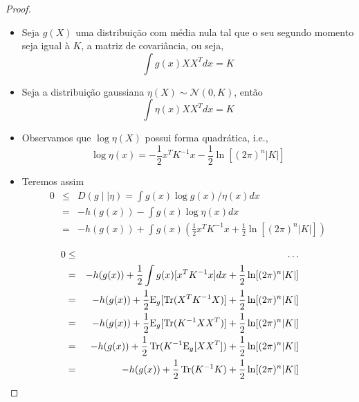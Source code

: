 \begin{frame}[allowframebreaks]
  \begin{proof}
  \begin{itemize}
  \item Seja $g(X)$ uma distribuição com média nula tal que o seu segundo momento seja igual à $K$, a matriz de covariância, ou seja,
	\begin{equation}
	\int g(x) X X^T dx = K
	\end{equation}
  \item Seja a distribuição gaussiana $\eta(X) \sim \mathcal{N}(0,K)$, então
        \begin{equation}
        \int \eta(x) X X^T dx = K
        \end{equation}
  \end{itemize}
  \proofbreak
  \begin{itemize}
  \item Observamos que $\log \eta (X)$ possui forma quadrática, i.e.,
	\begin{equation}
	\log \eta (x) = - \frac{1}{2} x^T K^{-1} x - \frac{1}{2} \ln [(2 \pi)^n \vert K \vert]
        \end{equation}
  \item Teremos assim
	\begin{eqnarray}
	0 &\leq& D(g \mid\mid \eta) = \int g(x) \log g(x) / \eta(x) dx \\
		&=& - h(g(x)) - \int g(x) \log \eta(x) dx \\
		&=& - h(g(x)) + \int g(x) \left( \frac{1}{2} x^T K^{-1} x + \frac{1}{2} \ln [(2 \pi)^n \vert K \vert] \right) 
	\end{eqnarray}
  \end{itemize}
  \proofbreak
	\vspace{-0.5cm}
	\begin{eqnarray}
	0	&\leq& \ldots \nonumber \\
		&=& - h(g(x)) + \frac{1}{2} \int g(x) [x^T K^{-1} x] dx + \frac{1}{2} \ln [(2 \pi)^n \vert K \vert] \\
		&=& - h(g(x)) + \frac{1}{2} \mathrm{E}_g[ \operatorname{Tr}( X^T K^{-1} X ) ] + \frac{1}{2} \ln [(2 \pi)^n \vert K \vert] \\
		&=& - h(g(x)) + \frac{1}{2} \mathrm{E}_g[ \operatorname{Tr}( K^{-1} X X^T ) ] + \frac{1}{2} \ln [(2 \pi)^n \vert K \vert] \\
		&=& - h(g(x)) + \frac{1}{2} \operatorname{Tr}( K^{-1} \mathrm{E}_g[ X X^T ] ) + \frac{1}{2} \ln [(2 \pi)^n \vert K \vert] \\
		&=& - h(g(x)) + \frac{1}{2} \operatorname{Tr}( K^{-1} K ) + \frac{1}{2} \ln [(2 \pi)^n \vert K \vert] 
	 \end{eqnarray}


\end{proof}
\end{frame}
